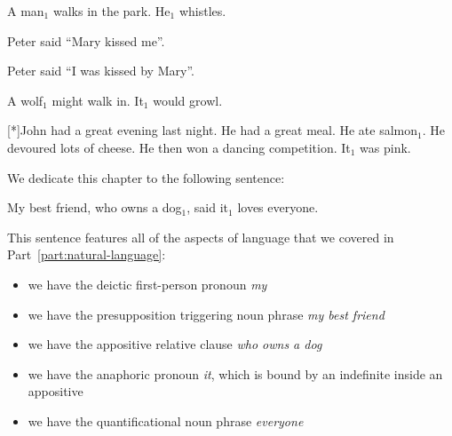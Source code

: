 \begin{exe}
   A man$_1$ walks in the park. He$_1$ whistles.
  \dotfill \pageref{ex:C-operator}
\end{exe}

\begin{exe}
   Peter said ``Mary kissed me''.
  \dotfill \pageref{ex:mary-peter}
\end{exe}

\begin{exe}
   Peter said ``I was kissed by Mary''.
  \dotfill \pageref{ex:peter-mary}
\end{exe}

\begin{exe}
   A wolf$_1$ might walk in. It$_1$ would growl.
  \dotfill \pageref{ex:modal-subordination}
\end{exe}

\begin{exe}
  [*]{John had a great evening last night. He had a great
    meal. He ate salmon$_1$. He devoured lots of cheese. He then won a
    dancing competition. It$_1$ was pink.
  \dotfill \pageref{ex:salmon}}
\end{exe}



\label{chap:final-example}

We dedicate this chapter to the following sentence:

\begin{exe}
   My best friend, who owns a dog$_1$, said it$_1$ loves
  everyone.
\end{exe}

This sentence features all of the aspects of language that we covered in
Part~\ref{part:natural-language}:

\begin{itemize}
\item we have the deictic first-person pronoun \emph{my}
\item we have the presupposition triggering noun phrase \emph{my best
    friend}
\item we have the appositive relative clause \emph{who owns a dog}
\item we have the anaphoric pronoun \emph{it}, which is bound by an
  indefinite inside an appositive
\item we have the quantificational noun phrase \emph{everyone}
\end{itemize}

